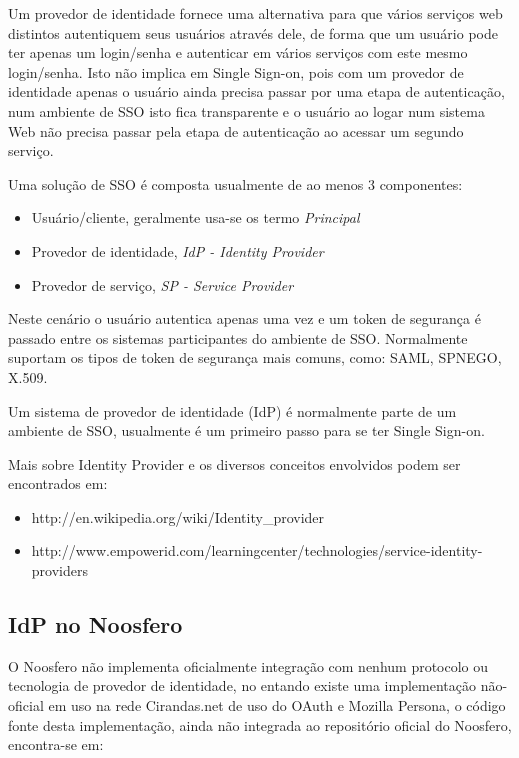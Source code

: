 \documentclass[11pt]{article}
\begin{document}
Um provedor de identidade fornece uma alternativa para que vários serviços web
distintos autentiquem seus usuários através dele, de forma que um usuário pode
ter apenas um login/senha e autenticar em vários serviços com este mesmo
login/senha. Isto não implica em Single Sign-on, pois com um provedor de
identidade apenas o usuário ainda precisa passar por uma etapa de
autenticação, num ambiente de SSO isto fica transparente e o usuário ao logar
num sistema Web não precisa passar pela etapa de autenticação ao acessar um
segundo serviço.

Uma solução de SSO é composta usualmente de ao menos 3 componentes:

\begin{itemize}
  \item{Usuário/cliente, geralmente usa-se os termo {\it Principal}}
  \item{Provedor de identidade, {\it IdP - Identity Provider}}
  \item{Provedor de serviço, {\it SP - Service Provider}}
\end{itemize}

Neste cenário o usuário autentica apenas uma vez e um token de segurança é
passado entre os sistemas participantes do ambiente de SSO. Normalmente
suportam os tipos de token de segurança mais comuns, como: SAML, SPNEGO,
X.509.

Um sistema de provedor de identidade (IdP) é normalmente parte de um ambiente
de SSO, usualmente é um primeiro passo para se ter Single Sign-on.

Mais sobre Identity Provider e os diversos conceitos envolvidos podem ser
encontrados em:
\begin{itemize}
  \item{http://en.wikipedia.org/wiki/Identity\_provider}
  \item{http://www.empowerid.com/learningcenter/technologies/service-identity-providers}
\end{itemize}

\subsection{IdP no Noosfero}

O Noosfero não implementa oficialmente integração com nenhum protocolo ou
tecnologia de provedor de identidade, no entando existe uma implementação
não-oficial em uso na rede Cirandas.net\cite{cirandasNET} de uso
do OAuth e Mozilla Persona, o código fonte desta implementação, ainda não
integrada ao repositório oficial do Noosfero, encontra-se em:
\end{document}
